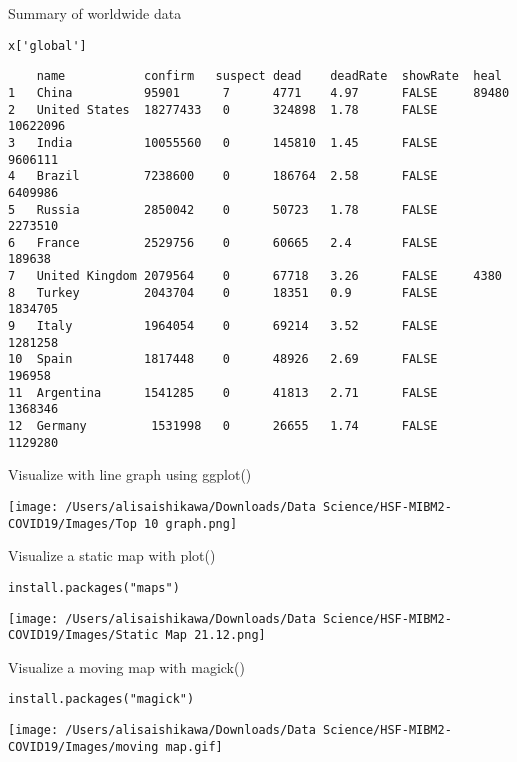 \documentclass[
  ignorenonframetext,
]{beamer}
\begin{document}
\begin{frame}[fragile]{Summary of worldwide data}
\protect\hypertarget{summary-of-worldwide-data}{}

\begin{verbatim}
x['global']
\end{verbatim}

\begin{verbatim}
    name           confirm   suspect dead    deadRate  showRate  heal
1   China          95901      7      4771    4.97      FALSE     89480
2   United States  18277433   0      324898  1.78      FALSE     10622096
3   India          10055560   0      145810  1.45      FALSE     9606111
4   Brazil         7238600    0      186764  2.58      FALSE     6409986
5   Russia         2850042    0      50723   1.78      FALSE     2273510
6   France         2529756    0      60665   2.4       FALSE     189638
7   United Kingdom 2079564    0      67718   3.26      FALSE     4380
8   Turkey         2043704    0      18351   0.9       FALSE     1834705
9   Italy          1964054    0      69214   3.52      FALSE     1281258
10  Spain          1817448    0      48926   2.69      FALSE     196958
11  Argentina      1541285    0      41813   2.71      FALSE     1368346
12  Germany         1531998   0      26655   1.74      FALSE     1129280
\end{verbatim}

\end{frame}

\begin{frame}{Visualize with line graph using ggplot()}
\protect\hypertarget{visualize-with-line-graph-using-ggplot}{}

\texttt{[image: /Users/alisaishikawa/Downloads/Data Science/HSF-MIBM2-COVID19/Images/Top 10 graph.png]}

\end{frame}

\begin{frame}[fragile]{Visualize a static map with plot()}
\protect\hypertarget{visualize-a-static-map-with-plot}{}

\begin{verbatim}
install.packages("maps")  
\end{verbatim}

\texttt{[image: /Users/alisaishikawa/Downloads/Data Science/HSF-MIBM2-COVID19/Images/Static Map 21.12.png]}

\end{frame}

\begin{frame}[fragile]{Visualize a moving map with magick()}
\protect\hypertarget{visualize-a-moving-map-with-magick}{}

\begin{verbatim}
install.packages("magick")  
\end{verbatim}

\texttt{[image: /Users/alisaishikawa/Downloads/Data Science/HSF-MIBM2-COVID19/Images/moving map.gif]}

\end{frame}
\end{document}
